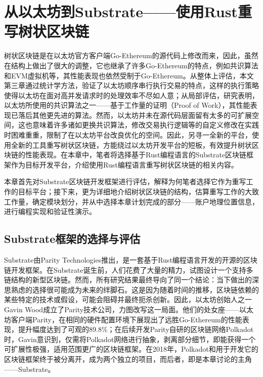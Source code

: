 %
%
%
%
%

\chapter{从以太坊到Substrate——使用Rust重写树状区块链}

树状区块链是在以太坊官方客户端Go-Ethereum的源代码上修改而来，因此，虽然在结构上做出了很大的调整，它也继承了许多Go-Ethereum的特点，例如共识算法和EVM虚拟机等，其性能表现也依然受制于Go-Ethereum。从整体上评估，本文第三章通过统计学方法，验证了以太坊顺序串行执行交易的特点，这样的执行策略使得以太坊在面对高并发请求时的处理效率不尽如人意；从局部评估，研究\cite{privateChainConsensus}表明，以太坊所使用的共识算法之一——基于工作量的证明（Proof of Work），其性能表现已落后其他更先进的算法。然而，以太坊并未在源代码层面留有太多的可扩展空间，这也意味着许多诸如更换共识算法，修改交易执行逻辑等的自定义修改在实践时困难重重，限制了在以太坊平台改良优化的空间。因此，另寻一全新的平台，使用全新的工具重写树状区块链，方能绕过以太坊开发平台的短板，有效提升树状区块链的性能表现。在本章中，笔者将选择基于Rust编程语言的Substrate区块链框架作为目标开发平台，介绍使用Rust编程语言重写树状区块链的相关内容。

本章首先对Substrate区块链开发框架进行评估，解释为何笔者选择它作为重写工作的目标平台；接下来，更为详细地介绍树状区块链的结构，估算重写工作的大致工作量，确定模块划分，并从中选择本章计划完成的部分——账户地理位置信息，进行编程实现和验证性演示。

\section{Substrate框架的选择与评估}

Substrate\cite{substrateHome}由Parity Technologies推出，是一套基于Rust编程语言开发的开源的区块链开发框架。在Substrate诞生前，人们花费了大量的精力，试图设计一个支持多链结构的新型区块链。然而，所有研究结果最终导向了同一个结论：当下做出的深思熟虑的选择很可能成为未来的绊脚石。这是因为随着时间的推移，区块链依赖的某些特定的技术或假设，可能会阻碍并最终扼杀创新\cite{substrateDoc}。因此，以太坊创始人之一Gavin Wood成立了Parity技术公司，力图改写这一局面。他们的处女座——以太坊客户端Parity，在相同的硬件配置环境下展现出了远胜Go-Ethereum的性能表现，提升幅度达到了可观的89.8\%\cite{parityVSgeth}；在后续开发Parity自研的区块链网络Polkadot时，Gavin意识到，仅需将Polkadot网络进行抽象，剥离部分细节，即能获得一个可扩展性极强，适用范围更广的区块链框架。在2018年，Polkadot和用于开发它的区块链框架终于被分离开，成为两个独立的项目，而后者，即是本章讨论的主角——Substrate。

